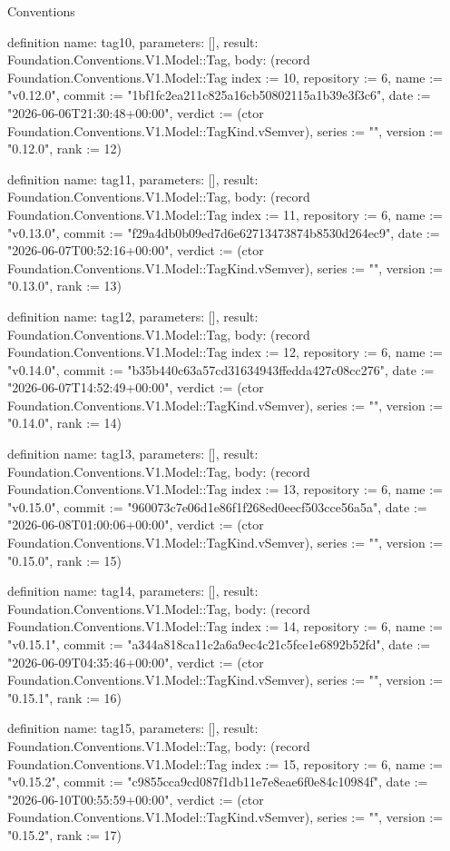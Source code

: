 \begin{lexlean}{Conventions}
\begin{semanticmodule}
definition{
  name: tag10,
  parameters: [],
  result: Foundation.Conventions.V1.Model::Tag,
  body: (record Foundation.Conventions.V1.Model::Tag {index := 10, repository := 6, name := "v0.12.0", commit := "1bf1fc2ea211c825a16cb50802115a1b39e3f3c6", date := "2026-06-06T21:30:48+00:00", verdict := (ctor Foundation.Conventions.V1.Model::TagKind.vSemver), series := "", version := "0.12.0", rank := 12})
}

definition{
  name: tag11,
  parameters: [],
  result: Foundation.Conventions.V1.Model::Tag,
  body: (record Foundation.Conventions.V1.Model::Tag {index := 11, repository := 6, name := "v0.13.0", commit := "f29a4db0b09ed7d6e62713473874b8530d264ec9", date := "2026-06-07T00:52:16+00:00", verdict := (ctor Foundation.Conventions.V1.Model::TagKind.vSemver), series := "", version := "0.13.0", rank := 13})
}

definition{
  name: tag12,
  parameters: [],
  result: Foundation.Conventions.V1.Model::Tag,
  body: (record Foundation.Conventions.V1.Model::Tag {index := 12, repository := 6, name := "v0.14.0", commit := "b35b440c63a57cd31634943ffedda427c08cc276", date := "2026-06-07T14:52:49+00:00", verdict := (ctor Foundation.Conventions.V1.Model::TagKind.vSemver), series := "", version := "0.14.0", rank := 14})
}

definition{
  name: tag13,
  parameters: [],
  result: Foundation.Conventions.V1.Model::Tag,
  body: (record Foundation.Conventions.V1.Model::Tag {index := 13, repository := 6, name := "v0.15.0", commit := "960073c7e06d1e86f1f268ed0eecf503cce56a5a", date := "2026-06-08T01:00:06+00:00", verdict := (ctor Foundation.Conventions.V1.Model::TagKind.vSemver), series := "", version := "0.15.0", rank := 15})
}

definition{
  name: tag14,
  parameters: [],
  result: Foundation.Conventions.V1.Model::Tag,
  body: (record Foundation.Conventions.V1.Model::Tag {index := 14, repository := 6, name := "v0.15.1", commit := "a344a818ca11c2a6a9ec4c21c5fce1e6892b52fd", date := "2026-06-09T04:35:46+00:00", verdict := (ctor Foundation.Conventions.V1.Model::TagKind.vSemver), series := "", version := "0.15.1", rank := 16})
}

definition{
  name: tag15,
  parameters: [],
  result: Foundation.Conventions.V1.Model::Tag,
  body: (record Foundation.Conventions.V1.Model::Tag {index := 15, repository := 6, name := "v0.15.2", commit := "c9855cca9cd087f1db11e7e8eae6f0e84c10984f", date := "2026-06-10T00:55:59+00:00", verdict := (ctor Foundation.Conventions.V1.Model::TagKind.vSemver), series := "", version := "0.15.2", rank := 17})
}


\end{semanticmodule}
\end{lexlean}
